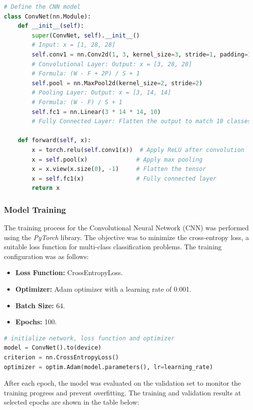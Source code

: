 \documentclass{article}
\begin{document}
\begin{lstlisting}[language=Python]
# Define the CNN model
class ConvNet(nn.Module):
    def __init__(self):
        super(ConvNet, self).__init__()
        # Input: x = [1, 28, 28]
        self.conv1 = nn.Conv2d(1, 3, kernel_size=3, stride=1, padding=1)  
        # Convolutional Layer: Output: x = [3, 28, 28]
        # Formula: (W - F + 2P) / S + 1
        self.pool = nn.MaxPool2d(kernel_size=2, stride=2)  
        # Pooling Layer: Output: x = [3, 14, 14]
        # Formula: (W - F) / S + 1
        self.fc1 = nn.Linear(3 * 14 * 14, 10)  
        # Fully Connected Layer: Flatten the output to match 10 classes

    def forward(self, x):
        x = torch.relu(self.conv1(x))  # Apply ReLU after convolution
        x = self.pool(x)              # Apply max pooling
        x = x.view(x.size(0), -1)     # Flatten the tensor
        x = self.fc1(x)               # Fully connected layer
        return x
\end{lstlisting}


\subsubsection{Model Training}
The training process for the Convolutional Neural Network (CNN) was performed using the \textit{PyTorch} library. The objective was to minimize the cross-entropy loss, a suitable loss function for multi-class classification problems. The training configuration was as follows:
\begin{itemize}
    \item \textbf{Loss Function:} CrossEntropyLoss.
    \item \textbf{Optimizer:} Adam optimizer with a learning rate of 0.001.
    \item \textbf{Batch Size:} 64.
    \item \textbf{Epochs:} 100.
\end{itemize}

\begin{lstlisting}[language=Python]
# initialize network, loss function and optimizer
model = ConvNet().to(device)
criterion = nn.CrossEntropyLoss()
optimizer = optim.Adam(model.parameters(), lr=learning_rate)
\end{lstlisting}

After each epoch, the model was evaluated on the validation set to monitor the training progress and prevent overfitting. The training and validation results at selected epochs are shown in the table below:
\end{document}
